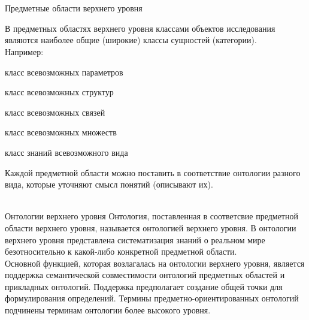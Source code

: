 \begin{frame}{\\}
	\topline
	\justifying
	\begin{SCn}
	\end{SCn}
\end{frame}

\begin{frame}{\\Предметные области верхнего уровня}
	\topline
	\justifying
	
	В предметных областях верхнего уровня классами объектов исследования являются наиболее общие (широкие) классы сущностей (категории). \\
	Например:
	\begin{textitemize}
		\item класс всевозможных параметров
		\item класс всевозможных структур
		\item класс всевозможных связей
		\item класс всевозможных множеств
		\item класс знаний всевозможного вида
	\end{textitemize}
	Каждой предметной области можно поставить в соответствие онтологии разного вида, которые уточняют смысл понятий (описывают их).
\end{frame}

\begin{frame}{\\Онтологии верхнего уровня}
	\topline
	\justifying
	 Онтология, поставленная в соответсвие предметной области верхнего уровня, называется онтологией верхнего уровня. В онтологии верхнего уровня представлена систематизация знаний о реальном мире безотносительно к какой-либо конкретной предметной области. \\\vspace{3mm}
	 Основной функцией, которая возлагалась на онтологии верхнего уровня, является поддержка семантической совместимости онтологий предметных областей и прикладных онтологий. Поддержка предполагает создание общей точки для формулирования определений. Термины предметно-ориентированных онтологий подчинены терминам онтологии более высокого уровня. \\
\end{frame}